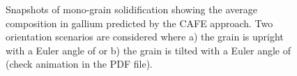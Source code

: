 {\begin{figure}[htbp]
\begin{subfigure}[t]{0.35\textwidth}
			\caption{}
  			\end{subfigure}
      		\caption{Snapshots of mono-grain solidification showing the average composition in gallium predicted by the CAFE approach. 
 			Two orientation scenarios are considered where a) the grain is upright with a Euler angle of  
 			or b) the grain is tilted with a Euler angle of  (check animation in the PDF file).}
			\label{fig:animate_monograin}
			\end{figure}
	}
